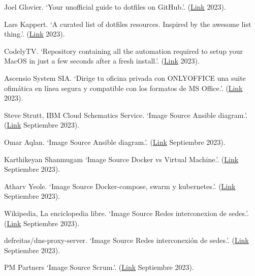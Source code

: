 \documentclass[spanish,final]{setup/eetac_tfc_pfc}
\begin{document}
\begin{thebibliography}{2}
Joel Glovier.
`Your unofficial guide to dotfiles on GitHub.'.
(\href{https://dotfiles.github.io/}{Link} 2023).

Lars Kappert.
`A curated list of dotfiles resources. Inspired by the awesome list thing.'.
(\href{https://github.com/webpro/awesome-dotfiles}{Link} 2023).

CodelyTV.
`Repository containing all the automation required to setup your MacOS in just a few seconds after a fresh install.'.
(\href{https://github.com/CodelyTV/dotfiles}{Link} 2023).

Ascensio System SIA.
`Dirige tu oficina privada con ONLYOFFICE una suite ofimática en línea segura y compatible con los formatos de MS Office.'.
(\href{https://www.onlyoffice.com/es/}{Link} 2023).

Steve Strutt, IBM Cloud Schematics Service.
`Image Source Ansible diagram.'.
(\href{https://www.ibm.com/blog/end-to-end-application-provisioning-with-ansible-and-terraform/}{Link} Septiembre 2023).

Omar Aqlan.
`Image Source Ansible diagram.'.
(\href{https://omaralhakimy.wordpress.com/2018/11/08/ansible-with-example/}{Link} Septiembre 2023).

Karthikeyan Shanmugam
`Image Source Docker vs Virtual Machine.'.
(\href{https://cloudnativenow.com/topics/cloudnativedevelopment/what-are-containers-and-why-do-we-need-them/}{Link} Septiembre 2023).

Atharv Yeole.
`Image Source Docker-compose, swarm y kubernetes.'.
(\href{https://atharvyeole.medium.com/best-analogy-to-understand-docker-docker-compose-docker-swarm-and-kubernetes-69cd980a6e6a}{Link} Septiembre 2023).

Wikipedia, La enciclopedia libre.
`Image Source Redes interconexion de sedes.'.
(\href{https://upload.wikimedia.org/wikipedia/commons/0/00/Virtual_Private_Network_overview.svg}{Link} Septiembre 2023).

defreitas/dns-proxy-server.
`Image Source Redes interconexión de sedes.'.
(\href{https://hub.docker.com/r/defreitas/dns-proxy-server}{Link} Septiembre 2023).

PM Partners
`Image Source Scrum.'.
(\href{https://www.pm-partners.com.au/the-agile-journey-a-scrum-overview/}{Link} Septiembre 2023).


\end{thebibliography}
\end{document}
